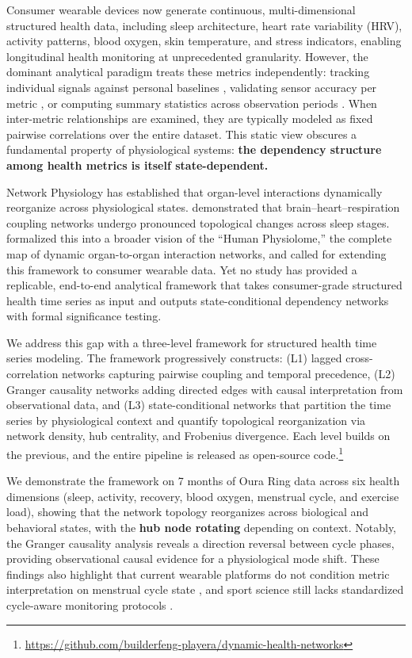 \documentclass[letterpaper]{article}
\begin{document}
Consumer wearable devices now generate continuous, multi-dimensional structured health data, including sleep architecture, heart rate variability (HRV), activity patterns, blood oxygen, skin temperature, and stress indicators, enabling longitudinal health monitoring at unprecedented granularity. However, the dominant analytical paradigm treats these metrics independently: tracking individual signals against personal baselines \citep{mishra2020}, validating sensor accuracy per metric \citep{cao2022}, or computing summary statistics across observation periods \citep{huhn2022}. When inter-metric relationships are examined, they are typically modeled as fixed pairwise correlations over the entire dataset. This static view obscures a fundamental property of physiological systems: \textbf{the dependency structure among health metrics is itself state-dependent.}

Network Physiology has established that organ-level interactions dynamically reorganize across physiological states. \citet{bartsch2015} demonstrated that brain--heart--respiration coupling networks undergo pronounced topological changes across sleep stages. \citet{ivanov2021} formalized this into a broader vision of the ``Human Physiolome,'' the complete map of dynamic organ-to-organ interaction networks, and called for extending this framework to consumer wearable data. Yet no study has provided a replicable, end-to-end analytical framework that takes consumer-grade structured health time series as input and outputs state-conditional dependency networks with formal significance testing.

We address this gap with a three-level framework for structured health time series modeling. The framework progressively constructs: (L1) lagged cross-correlation networks capturing pairwise coupling and temporal precedence, (L2) Granger causality networks adding directed edges with causal interpretation from observational data, and (L3) state-conditional networks that partition the time series by physiological context and quantify topological reorganization via network density, hub centrality, and Frobenius divergence. Each level builds on the previous, and the entire pipeline is released as open-source code.\footnote{\url{https://github.com/builderfeng-playera/dynamic-health-networks}}

We demonstrate the framework on 7 months of Oura Ring data across six health dimensions (sleep, activity, recovery, blood oxygen, menstrual cycle, and exercise load), showing that the network topology reorganizes across biological and behavioral states, with the \textbf{hub node rotating} depending on context. Notably, the Granger causality analysis reveals a direction reversal between cycle phases, providing observational causal evidence for a physiological mode shift. These findings also highlight that current wearable platforms do not condition metric interpretation on menstrual cycle state \citep{alzueta2022,goodale2019}, and sport science still lacks standardized cycle-aware monitoring protocols \citep{carmichael2025}.
\end{document}

